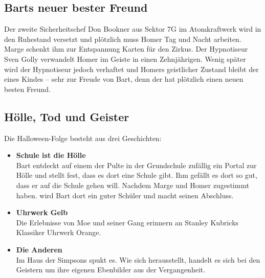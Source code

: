 
\subsection{Barts neuer bester Freund}\label{TABF05}
Der zweite Sicherheitschef Don Bookner aus Sektor 7G im Atomkraftwerk wird in den Ruhestand versetzt und plötzlich muss Homer Tag und Nacht arbeiten. Marge schenkt ihm zur Entspannung Karten für den Zirkus. Der Hypnotiseur Sven Golly verwandelt Homer im Geiste in einen Zehnjährigen. Wenig später wird der Hypnotiseur jedoch verhaftet und Homers geistlicher Zustand bleibt der eines Kindes -- sehr zur Freude von Bart, denn der hat plötzlich einen neuen besten Freund.


\subsection{Hölle, Tod und Geister}
Die Halloween-Folge besteht aus drei Geschichten:
\begin{itemize}
	\item \textbf{Schule ist die Hölle}\\ Bart entdeckt auf einem der Pulte in der Grundschule zufällig ein Portal zur Hölle und stellt fest, dass es dort eine Schule gibt. Ihm gefällt es dort so gut, dass er auf die Schule gehen will. Nachdem Marge und Homer zugestimmt haben. wird Bart dort ein guter Schüler und macht seinen Abschluss.
	\item \textbf{Uhrwerk Gelb}\\ Die Erlebnisse von Moe und seiner Gang erinnern an Stanley Kubricks Klassiker \glqq Uhrwerk Orange\grqq .
	\item \textbf{Die Anderen}\\ Im Haus der Simpsons spukt es. Wie sich herausstellt, handelt es sich bei den Geistern um ihre eigenen Ebenbilder aus der Vergangenheit.
\end{itemize}


